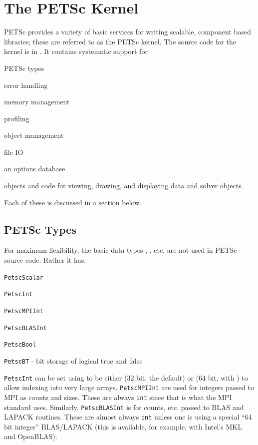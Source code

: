 \chapter{The PETSc Kernel}
\label{chapter:kernel}
PETSc provides a variety of basic services for writing scalable, component
based libraries; these are referred to as the PETSc kernel. The source
code for the kernel is in . It contains systematic support for
\begin{tightitemize}
  \item PETSc types
  \item error handling
  \item memory management
  \item profiling
  \item object management
  \item file IO
  \item an options database
  \item objects and code for viewing, drawing, and displaying data and solver objects.
\end{tightitemize}
Each of these is discussed in a section below.

\section{PETSc Types}
For maximum flexibility, the basic data types , , etc. are
 not used in PETSc source code. Rather it has:
\begin{tightitemize}
  \item \lstinline{PetscScalar}
  \item \lstinline{PetscInt}
  \item \lstinline{PetscMPIInt}
  \item \lstinline{PetscBLASInt}
  \item \lstinline{PetscBool}
  \item \lstinline{PetscBT} - bit storage of logical true and false
\end{tightitemize}
\lstinline{PetscInt} can be set using  to be either  (32 bit, the default) or 
(64 bit, with ) to allow indexing into very large arrays. 
\lstinline{PetscMPIInt} are used for integers passed to MPI as counts and sizes. 
These are always \lstinline{int} since that is what the MPI standard uses. 
Similarly, \lstinline{PetscBLASInt} is for counts, etc. passed to BLAS and LAPACK routines. 
These are almost always \lstinline{int} unless one is using a special ``64 bit integer'' BLAS/LAPACK (this is available, for
example,  with Intel's MKL and OpenBLAS).

